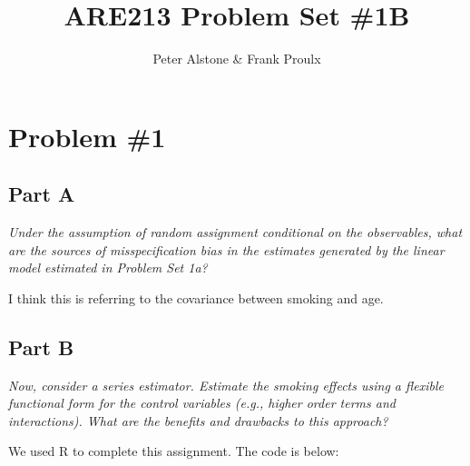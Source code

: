 \documentclass[letterpaper, 12pt]{article}
\begin{document}
\title{ARE213 Problem Set \#1B}
\author{Peter Alstone \& Frank Proulx}
\maketitle

\section{Problem \#1}
\subsection{Part A}
\emph{Under the assumption of random assignment conditional on the observables, what are the sources of misspecification bias in the estimates generated by the linear model estimated in Problem Set 1a?}

I think this is referring to the covariance between smoking and age.




\subsection{Part B}
\emph{Now, consider a series estimator. Estimate the smoking effects using a flexible functional form for the control variables (e.g., higher order terms and interactions). What are the benefits and drawbacks to this approach?}





We used R to complete this assignment.  The code is below:




\end{document}
